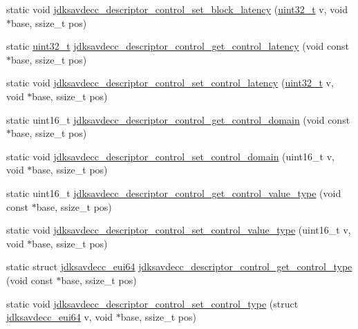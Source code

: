 \begin{DoxyCompactItemize}
\item 
static void \hyperlink{group__descriptor__control_ga9338340fc545cdf4bbc854d04878a2d6}{jdksavdecc\+\_\+descriptor\+\_\+control\+\_\+set\+\_\+block\+\_\+latency} (\hyperlink{parse_8c_a6eb1e68cc391dd753bc8ce896dbb8315}{uint32\+\_\+t} v, void $\ast$base, ssize\+\_\+t pos)
\item 
static \hyperlink{parse_8c_a6eb1e68cc391dd753bc8ce896dbb8315}{uint32\+\_\+t} \hyperlink{group__descriptor__control_gaab96ebb6faa4b5ec2e13c0e816ce99cc}{jdksavdecc\+\_\+descriptor\+\_\+control\+\_\+get\+\_\+control\+\_\+latency} (void const $\ast$base, ssize\+\_\+t pos)
\item 
static void \hyperlink{group__descriptor__control_ga342a555f3b2973609238eb1e00af0b1c}{jdksavdecc\+\_\+descriptor\+\_\+control\+\_\+set\+\_\+control\+\_\+latency} (\hyperlink{parse_8c_a6eb1e68cc391dd753bc8ce896dbb8315}{uint32\+\_\+t} v, void $\ast$base, ssize\+\_\+t pos)
\item 
static uint16\+\_\+t \hyperlink{group__descriptor__control_gacaf61b58bf830f4b1624075f361ecbf5}{jdksavdecc\+\_\+descriptor\+\_\+control\+\_\+get\+\_\+control\+\_\+domain} (void const $\ast$base, ssize\+\_\+t pos)
\item 
static void \hyperlink{group__descriptor__control_ga14fcc353b60eacf46a5437724c5fa836}{jdksavdecc\+\_\+descriptor\+\_\+control\+\_\+set\+\_\+control\+\_\+domain} (uint16\+\_\+t v, void $\ast$base, ssize\+\_\+t pos)
\item 
static uint16\+\_\+t \hyperlink{group__descriptor__control_ga6f8551ec542edcc8b1f8b3abc8976e33}{jdksavdecc\+\_\+descriptor\+\_\+control\+\_\+get\+\_\+control\+\_\+value\+\_\+type} (void const $\ast$base, ssize\+\_\+t pos)
\item 
static void \hyperlink{group__descriptor__control_ga6987d25fe8b350b840de8b60139c2904}{jdksavdecc\+\_\+descriptor\+\_\+control\+\_\+set\+\_\+control\+\_\+value\+\_\+type} (uint16\+\_\+t v, void $\ast$base, ssize\+\_\+t pos)
\item 
static struct \hyperlink{structjdksavdecc__eui64}{jdksavdecc\+\_\+eui64} \hyperlink{group__descriptor__control_gab56d5f84488a18312975c02d942d4b12}{jdksavdecc\+\_\+descriptor\+\_\+control\+\_\+get\+\_\+control\+\_\+type} (void const $\ast$base, ssize\+\_\+t pos)
\item 
static void \hyperlink{group__descriptor__control_ga691519167438e133dd69dde015aabb92}{jdksavdecc\+\_\+descriptor\+\_\+control\+\_\+set\+\_\+control\+\_\+type} (struct \hyperlink{structjdksavdecc__eui64}{jdksavdecc\+\_\+eui64} v, void $\ast$base, ssize\+\_\+t pos)

\end{DoxyCompactItemize}
